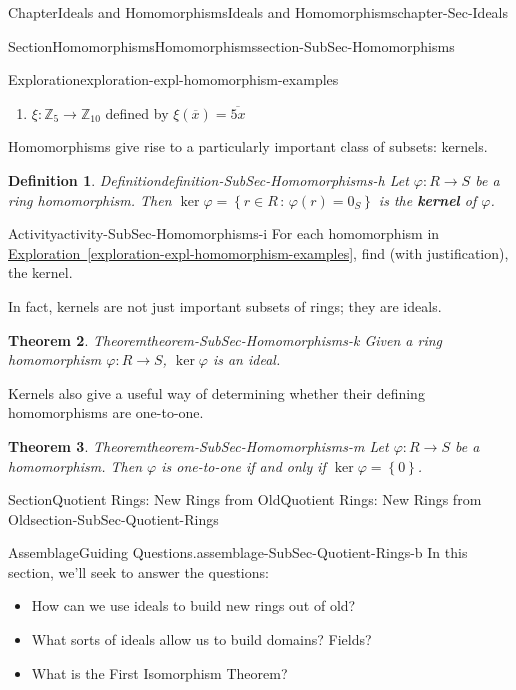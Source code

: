 \documentclass[oneside,10pt,]{book}
\newcommand{\xreffont}{\relax}
\newcommand{\terminology}[1]{\textbf{#1}}
\numberwithin{equation}{section}
\def\p{\varphi}
\newcommand{\set}[1]{\left\{ {#1} \right\}}
\newcommand{\setof}[2]{{\left\{#1\,\colon\,#2\right\}}}
\def\Z{{\mathbb Z}}
\newtheorem{theorem}{Theorem}[section]
\newtheorem{definition}[theorem]{Definition}
\begin{document}
\begin{chapterptx}{Chapter}{Ideals and Homomorphisms}{}{Ideals and Homomorphisms}{}{}{chapter-Sec-Ideals}
\begin{sectionptx}{Section}{Homomorphisms}{}{Homomorphisms}{}{}{section-SubSec-Homomorphisms}
\begin{exploration}{Exploration}{}{exploration-expl-homomorphism-examples}
\begin{enumerate}
\item{}\(\xi : \Z_5 \to \Z_{10}\) defined by \(\xi(\overline{x}) = \overline{5x}\)%
\end{enumerate}
\end{exploration}%
Homomorphisms give rise to a particularly important class of subsets: kernels.%
\begin{definition}{Definition}{}{definition-SubSec-Homomorphisms-h}%
Let \(\p : R \to S\) be a ring homomorphism. Then \(\ker \p =\setof{r\in R}{\p(r)=0_S}\) is the \terminology{kernel} of \(\p\).%
\end{definition}
\begin{activity}{Activity}{}{activity-SubSec-Homomorphisms-i}%
For each homomorphism in \hyperref[exploration-expl-homomorphism-examples]{Exploration~{\xreffont\ref{exploration-expl-homomorphism-examples}}}, find (with justification), the kernel.%
\end{activity}%
In fact, kernels are not just important subsets of rings; they are ideals.%
\begin{theorem}{Theorem}{}{}{theorem-SubSec-Homomorphisms-k}%
Given a ring homomorphism \(\p : R\to S\), \(\ker\p\) is an ideal.%
\end{theorem}
Kernels also give a useful way of determining whether their defining homomorphisms are one-to-one.%
\begin{theorem}{Theorem}{}{}{theorem-SubSec-Homomorphisms-m}%
Let \(\p : R\to S\) be a homomorphism. Then \(\p\) is one-to-one if and only if \(\ker\p = \set{0}\).%
\end{theorem}
\end{sectionptx}
%
%
\typeout{************************************************}
\typeout{************************************************}
%
\begin{sectionptx}{Section}{Quotient Rings: New Rings from Old}{}{Quotient Rings: New Rings from Old}{}{}{section-SubSec-Quotient-Rings}
\begin{assemblage}{Assemblage}{Guiding Questions.}{assemblage-SubSec-Quotient-Rings-b}%
In this section, we'll seek to answer the questions: %
\begin{itemize}[label=\textbullet]
\item{}How can we use ideals to build new rings out of old?%
\item{}What sorts of ideals allow us to build domains? Fields?%
\item{}What is the First Isomorphism Theorem?%
\end{itemize}

\end{assemblage}
\end{sectionptx}
\end{chapterptx}
\end{document}
